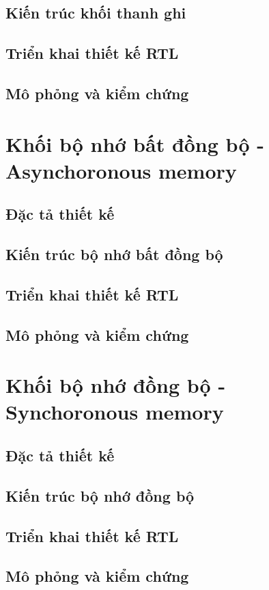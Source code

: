 \subsection{Kiến trúc khối thanh ghi}
\label{subsec:m1-reg_file_arch}

\subsection{Triển khai thiết kế RTL}
\label{subsec:m1-reg_file_rtl}

\subsection{Mô phỏng và kiểm chứng}
\label{subsec:m1-reg_file_test}

\section{Khối bộ nhớ bất đồng bộ - Asynchoronous memory}
\label{sec:m1-async_mem}

\subsection{Đặc tả thiết kế}
\label{subsec:m1-asyn_mem_spec}

\subsection{Kiến trúc bộ nhớ bất đồng bộ}
\label{subsec:m1-asyn_mem_arch}

\subsection{Triển khai thiết kế RTL}
\label{subsec:m1-asyn_mem_rtl}

\subsection{Mô phỏng và kiểm chứng}
\label{subsec:m1-asyn_mem_test}

\section{Khối bộ nhớ đồng bộ - Synchoronous memory}
\label{sec:m1-sync_mem}

\subsection{Đặc tả thiết kế}
\label{subsec:m1-syn_mem_spec}

\subsection{Kiến trúc bộ nhớ đồng bộ}
\label{subsec:m1-syn_mem_arch}

\subsection{Triển khai thiết kế RTL}
\label{subsec:m1-syn_mem_rtl}

\subsection{Mô phỏng và kiểm chứng}
\label{subsec:m1-syn_mem_test}